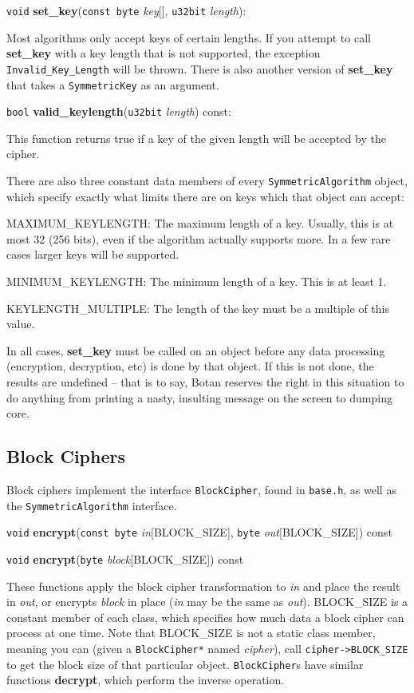 \documentclass{article}
\newcommand{\filename}[1]{\texttt{#1}}
\newcommand{\function}[1]{\textbf{#1}}
\newcommand{\type}[1]{\texttt{#1}}
\renewcommand{\arg}[1]{\textsl{#1}}
\begin{document}
\noindent
\type{void} \function{set\_key}(\type{const byte} \arg{key}[], \type{u32bit}
\arg{length}):

Most algorithms only accept keys of certain lengths. If you attempt to call
\function{set\_key} with a key length that is not supported, the exception
\type{Invalid\_Key\_Length} will be thrown. There is also another version of
\function{set\_key} that takes a \type{SymmetricKey} as an argument.

\noindent
\type{bool} \function{valid\_keylength}(\type{u32bit} \arg{length}) const:

This function returns true if a key of the given length will be accepted by
the cipher.

There are also three constant data members of every \type{SymmetricAlgorithm}
object, which specify exactly what limits there are on keys which that object
can accept:

MAXIMUM\_KEYLENGTH: The maximum length of a key. Usually, this is at most 32
(256 bits), even if the algorithm actually supports more. In a few rare cases
larger keys will be supported.

MINIMUM\_KEYLENGTH: The minimum length of a key. This is at least 1.

KEYLENGTH\_MULTIPLE: The length of the key must be a multiple of this value.

In all cases, \function{set\_key} must be called on an object before any data
processing (encryption, decryption, etc) is done by that object. If this is not
done, the results are undefined -- that is to say, Botan reserves the right in
this situation to do anything from printing a nasty, insulting message on the
screen to dumping core.

\subsection{Block Ciphers}

Block ciphers implement the interface \type{BlockCipher}, found in
\filename{base.h}, as well as the \type{SymmetricAlgorithm} interface.

\noindent
\type{void} \function{encrypt}(\type{const byte} \arg{in}[BLOCK\_SIZE],
                               \type{byte} \arg{out}[BLOCK\_SIZE]) const

\noindent
\type{void} \function{encrypt}(\type{byte} \arg{block}[BLOCK\_SIZE]) const

These functions apply the block cipher transformation to \arg{in} and
place the result in \arg{out}, or encrypts \arg{block} in place
(\arg{in} may be the same as \arg{out}). BLOCK\_SIZE is a constant
member of each class, which specifies how much data a block cipher can
process at one time. Note that BLOCK\_SIZE is not a static class
member, meaning you can (given a \type{BlockCipher*} named
\arg{cipher}), call \verb|cipher->BLOCK_SIZE| to get the block size of
that particular object. \type{BlockCipher}s have similar functions
\function{decrypt}, which perform the inverse operation.
\end{document}
